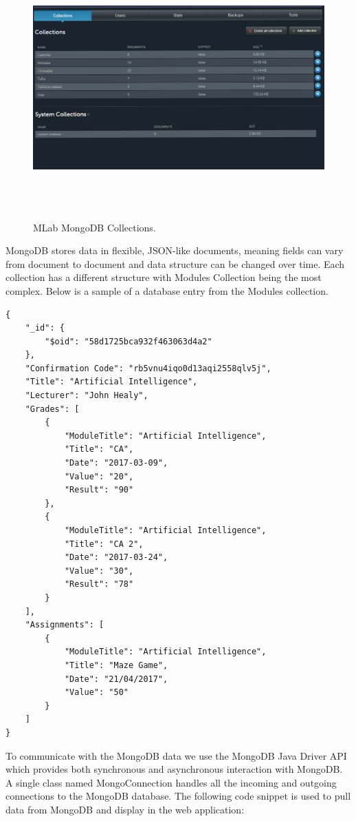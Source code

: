 \begin{figure}[h]
\centering
\includegraphics[width=15cm, height=10cm]{img/MongoDB}
\caption{MLab MongoDB Collections.}
\label{fig:MongoDBCollections}
\end{figure}

MongoDB stores data in flexible, JSON-like documents, meaning fields can vary from document to document and data structure can be changed over time\cite{MongoAbout}. Each collection has a different structure with Modules Collection being the most complex.  Below is a sample of a database entry from the Modules collection.
\begin{verbatim}
{
    "_id": {
        "$oid": "58d1725bca932f463063d4a2"
    },
    "Confirmation Code": "rb5vnu4iqo0d13aqi2558qlv5j",
    "Title": "Artificial Intelligence",
    "Lecturer": "John Healy",
    "Grades": [
        {
            "ModuleTitle": "Artificial Intelligence",
            "Title": "CA",
            "Date": "2017-03-09",
            "Value": "20",
            "Result": "90"
        },
        {
            "ModuleTitle": "Artificial Intelligence",
            "Title": "CA 2",
            "Date": "2017-03-24",
            "Value": "30",
            "Result": "78"
        }
    ],
    "Assignments": [
        {
            "ModuleTitle": "Artificial Intelligence",
            "Title": "Maze Game",
            "Date": "21/04/2017",
            "Value": "50"
        }
    ]
}

\end{verbatim}

To communicate with the MongoDB data we use the MongoDB Java Driver API which provides both synchronous and asynchronous interaction with MongoDB\cite{JavaMongoDriver}. A single class named MongoConnection handles all the incoming and outgoing connections to the MongoDB database. The following code snippet is used to pull data from MongoDB and display in the web application:


